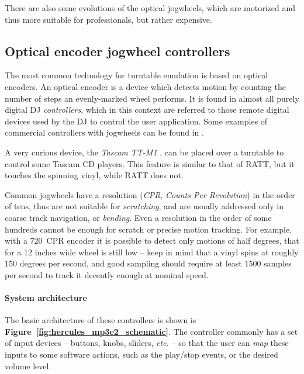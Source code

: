 \documentclass[a4paper,10pt]{article}
\newcommand{\citef}[1]{\textbf{Figure~\ref{#1}}}
\begin{document}
\begin{multicols}{2}
There are also some evolutions of the optical jogwheels, which are motorized
\cite{denon_sc3900} \cite{numark_v7} and thus more suitable for professionals,
but rather expensive.


\subsection{Optical encoder jogwheel controllers}

The most common technology for turntable emulation is based on optical encoders.
An optical encoder is a device which detects motion by counting the number of
steps an evenly-marked wheel performs. It is found in almost all purely digital
DJ \emph{controllers}, which in this context are referred to those remote
digital devices used by the DJ to control the user application. Some examples
of commercial controllers with jogwheels can be found in \cite{eks_op}
\cite{pioneer_ddjs1} \cite{vestax_vci400}.

A very curious device, the \emph{Tascam TT-M1} \cite{tascam_ttm1}, can be
placed over a turntable to control some Tascam CD players. This feature is
similar to that of RATT, but it touches the spinning vinyl, while RATT does
not.

Common jogwheels have a resolution (\emph{CPR}, \emph{Counts Per Revolution})
in the order of tens, thus are not suitable for \emph{scratching}, and are
usually addressed only in coarse track navigation, or \emph{bending}.
Even a resolution in the order of some hundreds cannot be enough for scratch
or precise motion tracking. For example, with a 720~CPR encoder it is possible
to detect only motions of half degrees, that for a 12 inches wide wheel is
still low -- keep in mind that a vinyl spins at roughly 150 degrees per second,
and good sampling should require at least 1500 samples per second to track it
decently enough at nominal speed.


\paragraph{System architecture}
The basic architecture of these controllers is shown is \citef{fig:hercules_mp3e2_schematic}.
The controller commonly has a set of input devices -- buttons, knobs,
sliders, \emph{etc.} -- so that the user can \emph{map} these inputs to some
software actions, such as the play/stop events, or the desired volume level.


\end{multicols}
\end{document}
